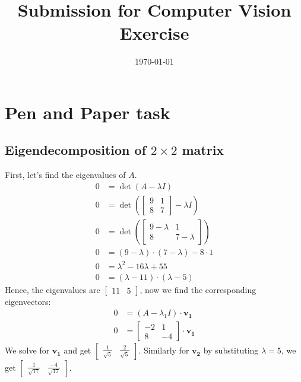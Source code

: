 \documentclass[addpoints]{exam}
\title{Submission for Computer Vision Exercise \assignmentnumber}
\author{\student}
\date{\today}
\begin{document}
    \maketitle


\section{Pen and Paper task}
\subsection{Eigendecomposition of $2 \times 2$ matrix}
First, let's find the eigenvalues of $A$.
\begin{align*}
	0 &= \det\left(A - \lambda I\right)\\
	0 &= \det\left( \begin{bmatrix} 9 & 1 \\ 8 & 7 \end{bmatrix} - \lambda I \right)\\
	0 &= \det\left( \begin{bmatrix} 9 - \lambda & 1 \\ 8 & 7 - \lambda \end{bmatrix}\right)\\
	0 &= \left( 9 - \lambda \right) \cdot \left( 7 - \lambda \right) - 8 \cdot 1\\
	0 &= \lambda^2 - 16\lambda + 55\\
	0 &= \left( \lambda - 11 \right) \cdot \left( \lambda - 5 \right)
\end{align*}
Hence, the eigenvalues are $\begin{bmatrix} 11 & 5 \end{bmatrix}$, now we find the corresponding eigenvectors:
\begin{align*}
	0 &= \left( A - \lambda_1 I \right) \cdot \mathbf{v_1}\\
	0 &= \begin{bmatrix} -2 & 1 \\ 8 & -4 \end{bmatrix} \cdot \mathbf{v_1}
\end{align*}
We solve for $\mathbf{v_1}$ and get $\begin{bmatrix} \frac{1}{\sqrt{5}} & \frac{2}{\sqrt{5}} \end{bmatrix}$. Similarly for $\mathbf{v_2}$ by substituting $\lambda = 5$, we get $\begin{bmatrix} \frac{1}{\sqrt{17}} & \frac{-4}{\sqrt{17}} \end{bmatrix}$.
\end{document}
